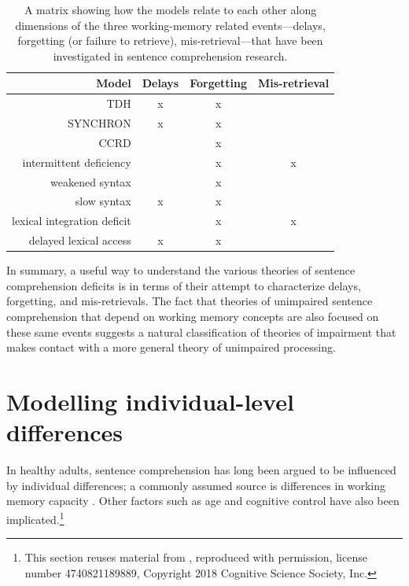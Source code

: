 \documentclass{cambridge7A}\usepackage[]{graphicx}\usepackage[]{color}
\begin{document}
\begin{table}[!htbp]
\centering
\begin{tabular}{rccc}
\hline
Model     &                        Delays  &     Forgetting    &	Mis-retrieval\\  
\hline
TDH                    &          x           &                   x    &	\\
SYNCHRON       &             x        &                  x      &	\\
CCRD                  &                        &                    x   &	\\
 intermittent deficiency   &              &          x             &	x	\\
 weakened syntax        &               &         x              &	\\
 slow syntax                  &   x          &        x   &	\\
 lexical integration deficit  &      &       x              &	x	\\
 delayed lexical access        &  x      &            x   &	\\
\hline
\end{tabular}
\caption{A matrix showing how the models relate to each other along dimensions of the three working-memory related events---delays, forgetting (or failure to retrieve), mis-retrieval---that have been investigated in sentence comprehension research.} \label{modelcomparison}
\end{table}

In summary, a useful way to understand the various theories of sentence comprehension deficits is in terms of their attempt to characterize delays, forgetting, and mis-retrievals. The fact that theories of unimpaired sentence comprehension that depend on working memory concepts
are also focused on these same events suggests a natural classification of theories of impairment that makes contact with a more general theory of unimpaired processing.

\section{Modelling individual-level differences}

In healthy adults, 
sentence comprehension has long been argued to be influenced by individual differences; a commonly assumed source is differences in working memory capacity \citep{DanemanCarpenter1980,JustCarpenter1992}. 
Other factors such as age \citep{CaplanWaters2005} and cognitive control \citep{novick2005cognitive} have also been implicated.\footnote{This section reuses material from \cite{MaetzigEtAltopics2018}, reproduced with permission, license number 4740821189889, Copyright 2018 Cognitive Science Society, Inc.}
\end{document}
